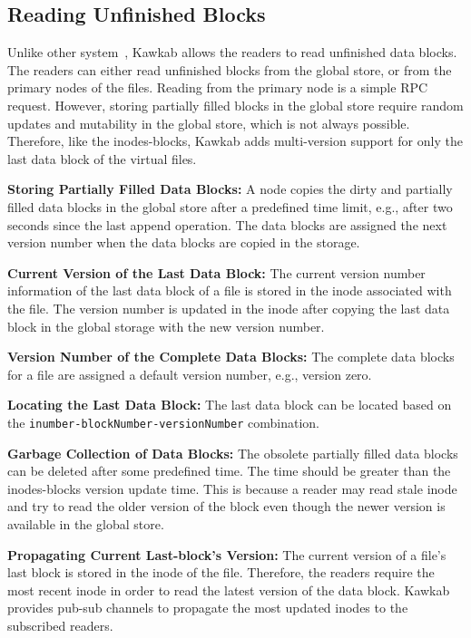\documentclass[]{article}
\newcommand{\subtopic}[1]{\vspace{1.5pt} \noindent \textbf{#1}}
\begin{document}
\subsection{Reading Unfinished Blocks}

Unlike other system~\cite{}, Kawkab allows the readers to read unfinished data
blocks. The readers can either read unfinished blocks from the global store, or
from the primary nodes of the files. Reading from the primary node is a simple
RPC request. However, storing partially filled blocks in the global store
require random updates and mutability in the global store, which is not always
possible. Therefore, like the inodes-blocks, Kawkab adds multi-version support
for only the last data block of the virtual files.

\subtopic{Storing Partially Filled Data Blocks:}
A node copies the dirty and partially filled data blocks in the global store after
a predefined time limit, e.g., after two seconds since the last append operation.
The data blocks are assigned the next version number when the data blocks are copied 
in the storage. 

\subtopic{Current Version of the Last Data Block:} The current version number
information of the last data block of a file is stored in the inode associated
with the file. The version number is updated in the inode after copying the
last data block in the global storage with the new version number.

\subtopic{Version Number of the Complete Data Blocks:} 
The complete data blocks for a file are assigned a default version number, e.g.,
version zero.

\subtopic{Locating the Last Data Block:} The last data block can be located
based on the \texttt{inumber-blockNumber-versionNumber} combination.

\subtopic{Garbage Collection of Data Blocks:}
The obsolete partially filled data blocks can be deleted after some predefined
time. The time should be greater than the inodes-blocks version update time.
This is because a reader may read stale inode and try to read the older version
of the block even though the newer version is available in the global store.


\subtopic{Propagating Current Last-block's Version:}
The current version of a file's last block is stored in the inode of the file.
Therefore, the readers require the most recent inode in order to read the
latest version of the data block. Kawkab provides pub-sub channels to propagate
the most updated inodes to the subscribed readers.
\end{document}
